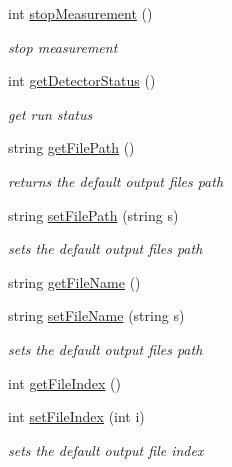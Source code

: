 \begin{CompactItemize}
int \hyperlink{classslsDetectorUsers_2abc673c45c1fe006f6b0fea6188e3a9}{stop\-Measurement} ()
\begin{CompactList}\small\item\em stop measurement \item\end{CompactList}\item 
int \hyperlink{classslsDetectorUsers_c7d0254e38b8fe783204f691a4ee05b2}{get\-Detector\-Status} ()
\begin{CompactList}\small\item\em get run status \item\end{CompactList}\item 
string \hyperlink{classslsDetectorUsers_81969295c2b08f14e9c3d4fa1f7d4e16}{get\-File\-Path} ()
\begin{CompactList}\small\item\em returns the default output files path \item\end{CompactList}\item 
string \hyperlink{classslsDetectorUsers_d833e1051299e101a5b5097c598ba9cb}{set\-File\-Path} (string s)
\begin{CompactList}\small\item\em sets the default output files path \item\end{CompactList}\item 
string \hyperlink{classslsDetectorUsers_5f30c83e8bf07a92fad0916d43e3799c}{get\-File\-Name} ()
\item 
string \hyperlink{classslsDetectorUsers_ff4a8ff4852e50d4ec05204cbc7fea9e}{set\-File\-Name} (string s)
\begin{CompactList}\small\item\em sets the default output files path \item\end{CompactList}\item 
int \hyperlink{classslsDetectorUsers_6e3467bf3c0c246f69f85d485d84dd62}{get\-File\-Index} ()
\item 
int \hyperlink{classslsDetectorUsers_6b92ea7e237c77aa5107d7aabf76fe2d}{set\-File\-Index} (int i)
\begin{CompactList}\small\item\em sets the default output file index \item\end{CompactList}\item 

\end{CompactItemize}
